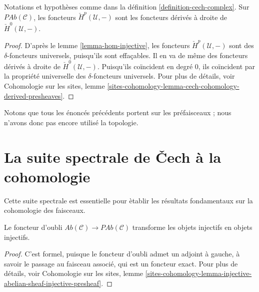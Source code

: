 \begin{theorem}
\label{theorem-cech-derived}
Notations et hypoth\`eses comme dans la d\'efinition \ref{definition-cech-complex}.
Sur $\textit{PAb}(\mathcal{C})$, les foncteurs $\check{H}^p(\mathcal{U}, -)$ sont
les foncteurs d\'eriv\'es \`a droite de $\check{H}^0(\mathcal{U}, -)$.
\end{theorem}

\begin{proof}
D'apr\`es le lemme \ref{lemma-hom-injective}, les foncteurs
$\check H^p(\mathcal{U}, -)$ sont des
$\delta$-foncteurs universels, puisqu'ils sont effa\c{c}ables.
Il en va de m\^eme des foncteurs d\'eriv\'es \`a droite de $\check H^0(\mathcal{U}, -)$. Puisqu'ils
co\"incident en degr\'e $0$, ils co\"incident par la propri\'et\'e universelle des
$\delta$-foncteurs universels. Pour plus de d\'etails, voir
Cohomologie sur les sites,
lemme \ref{sites-cohomology-lemma-cech-cohomology-derived-presheaves}.
\end{proof}

\begin{remark}
\label{remark-presheaves-no-topology}
Notons que tous les \'enonc\'es pr\'ec\'edents portent sur les pr\'efaisceaux ; nous n'avons donc
pas encore utilis\'e la topologie.
\end{remark}




\section{La suite spectrale de {\v C}ech \`a la cohomologie}
\label{section-cech-ss}

\noindent
Cette suite spectrale est essentielle pour \`etablir les r\'esultats fondamentaux sur la
cohomologie des faisceaux.

\begin{lemma}
\label{lemma-forget-injectives}
Le foncteur d'oubli $\textit{Ab}(\mathcal{C})\to \textit{PAb}(\mathcal{C})$
transforme les objets injectifs en objets injectifs.
\end{lemma}

\begin{proof}
C'est formel, puisque le foncteur d'oubli admet un adjoint \`a gauche,
\`a savoir le passage au faisceau associ\'e, qui est un foncteur exact. Pour plus de d\'etails, voir
Cohomologie sur les sites,
lemme \ref{sites-cohomology-lemma-injective-abelian-sheaf-injective-presheaf}.
\end{proof}

